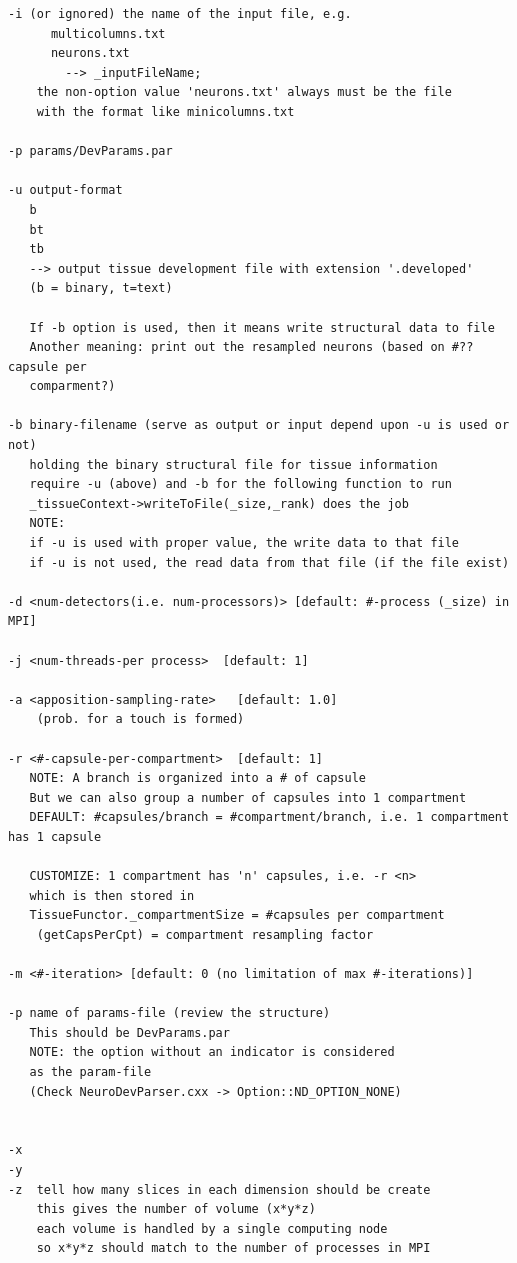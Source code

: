 {\tiny
\begin{Verbatim}
-i (or ignored) the name of the input file, e.g.
      multicolumns.txt
      neurons.txt
        --> _inputFileName;   
    the non-option value 'neurons.txt' always must be the file 
    with the format like minicolumns.txt

-p params/DevParams.par

-u output-format   
   b
   bt
   tb
   --> output tissue development file with extension '.developed'
   (b = binary, t=text)

   If -b option is used, then it means write structural data to file
   Another meaning: print out the resampled neurons (based on #?? capsule per
   comparment?)
      
-b binary-filename (serve as output or input depend upon -u is used or not)
   holding the binary structural file for tissue information
   require -u (above) and -b for the following function to run
   _tissueContext->writeToFile(_size,_rank) does the job   
   NOTE:
   if -u is used with proper value, the write data to that file
   if -u is not used, the read data from that file (if the file exist)

-d <num-detectors(i.e. num-processors)> [default: #-process (_size) in MPI]

-j <num-threads-per process>  [default: 1]

-a <apposition-sampling-rate>   [default: 1.0]
    (prob. for a touch is formed)

-r <#-capsule-per-compartment>  [default: 1]
   NOTE: A branch is organized into a # of capsule
   But we can also group a number of capsules into 1 compartment
   DEFAULT: #capsules/branch = #compartment/branch, i.e. 1 compartment has 1 capsule
   
   CUSTOMIZE: 1 compartment has 'n' capsules, i.e. -r <n> 
   which is then stored in
   TissueFunctor._compartmentSize = #capsules per compartment 
    (getCapsPerCpt) = compartment resampling factor
   
-m <#-iteration> [default: 0 (no limitation of max #-iterations)]

-p name of params-file (review the structure)
   This should be DevParams.par
   NOTE: the option without an indicator is considered
   as the param-file
   (Check NeuroDevParser.cxx -> Option::ND_OPTION_NONE)
   

-x
-y
-z  tell how many slices in each dimension should be create
    this gives the number of volume (x*y*z) 
    each volume is handled by a single computing node
    so x*y*z should match to the number of processes in MPI

\end{Verbatim}
}


